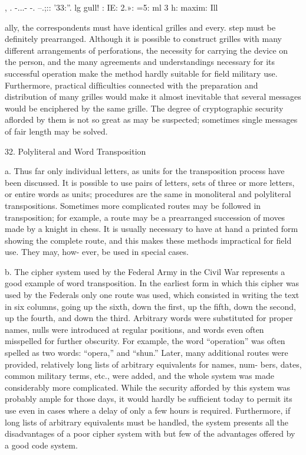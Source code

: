 , . -...- -. --.;:: '33:”. lg gull!
: IE: 2.»: =5: ml 3 h: maxim: Ill

ally, the correspondents must have identical grilles and every. step must
be deﬁnitely prearranged. Although it is possible to construct grilles with
many different arrangements of perforations, the necessity for carrying
the device on the person, and the many agreements and understandings
necessary for its successful operation make the method hardly suitable
for ﬁeld military use. Furthermore, practical difﬁculties connected with
the preparation and distribution of many grilles would make it almost
inevitable that several messages would be enciphered by the same grille.
The degree of cryptographic security aﬂorded by them is not so great as
may be suspected; sometimes single messages of fair length may
be solved.

32. Polyliteral and Word Transposition

a. Thus far only individual letters, as units for the transposition
process have been discussed. It is possible to use pairs of letters, sets of
three or more letters, or entire words as units; procedures are the same
in monoliteral and polyliteral transpositions. Sometimes more complicated
routes may be followed in transposition; for example, a route may be a
prearranged succession of moves made by a knight in chess. It is usually
necessary to have at hand a printed form showing the complete route,
and this makes these methods impractical for ﬁeld use. They may, how-
ever, be used in special cases.

b. The cipher system used by the Federal Army in the Civil War
represents a good example of word transposition. In the earliest form
in which this cipher was used by the Federals only one route was used,
which consisted in writing the text in six columns, going up the sixth,
down the ﬁrst, up the ﬁfth, down the second, up the fourth, and down
the third. Arbitrary words were substituted for proper names, nulls were
introduced at regular positions, and words even often misspelled for
further obscurity. For example, the word “operation” was often spelled
as two words: “opera,” and “shun.” Later, many additional routes were
provided, relatively long lists of arbitrary equivalents for names, num-
bers, dates, common military terms, etc., were added, and the whole
system was made considerably more complicated. While the security
afforded by this system was probably ample for those days, it would
hardly be sufﬁcient today to permit its use even in cases where a delay
of only a few hours is required. Furthermore, if long lists of arbitrary
equivalents must be handled, the system presents all the disadvantages of
a poor cipher system with but few of the advantages offered by a good
code system.

